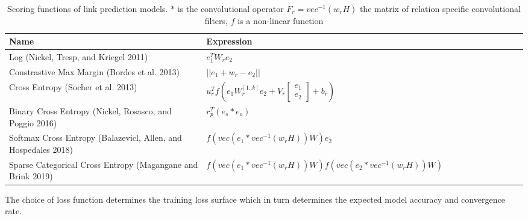 \begin{table}[H]
	\centering
	\begin{tabular}{lllllllllll}
  		\textbf{Name} & \textbf{Expression} \\
  		\hline
  		Log (Nickel, Tresp, and Kriegel 2011) & $e^T_1W_r e_2$  \\
  		Constrastive Max Margin (Bordes et al. 2013) & $|| e_1 + w_r - e_2 ||$ \\
  		Cross Entropy (Socher et al. 2013) & $u^T_r f(e_1W_r^{[1..k]} e_2 + V_r \begin{bmatrix}e_1 \\ e_2\end{bmatrix} + b_r)$ \\
  		Binary Cross Entropy (Nickel, Rosasco, and Poggio 2016) & $r^T_p(e_s * e_o)$ \\
  		Softmax Cross Entropy (Balazevicl, Allen, and Hospedales 2018) & $f(vec(e_1 * vec^{-1}(w_rH))W)e_2$ \\
  		Sparse Categorical Cross Entropy (Magangane and Brink 2019) & $f(vec(e_1 * vec^{-1}(w_rH))W)f(vec(e_2 * vec^{-1}(w_rH))W)$
		\end{tabular}
 	\caption {Scoring functions of link prediction models. $*$ is the convolutional operator $F_r = vec^{-1}(w_rH)$ the matrix of relation specific convolutional filters, $f$ is a non-linear function}
\end{table} 

The choice of loss function determines the training loss surface which in turn determines the expected model accuracy and convergence rate.


